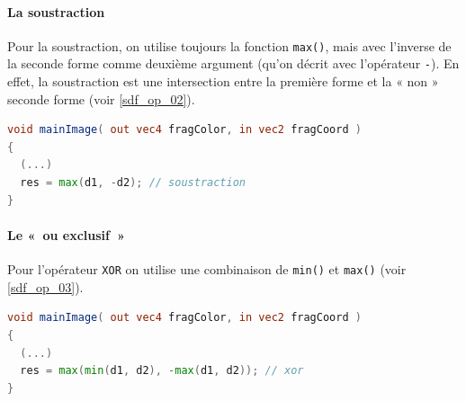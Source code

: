 \paragraph*{La soustraction}

Pour la soustraction, on utilise toujours la fonction \lstinline{max()}, mais avec l'inverse de la seconde forme comme deuxième argument (qu'on décrit avec l'opérateur \lstinline{-}). En effet, la soustraction est une intersection entre la première forme et la « non » seconde forme (voir \ref{sdf_op_02}).

\begin{minipage}{\linewidth}
\begin{lstlisting}[language=GLSL, caption=Soustraction,captionpos=b,frame=single]
void mainImage( out vec4 fragColor, in vec2 fragCoord )
{
  (...)
  res = max(d1, -d2); // soustraction
}
\end{lstlisting}
\end{minipage}

\paragraph*{Le «~ou exclusif~»}

Pour l'opérateur \lstinline{XOR} on utilise une combinaison de \lstinline{min()} et \lstinline{max()} (voir \ref{sdf_op_03}).

\begin{minipage}{\linewidth}
\begin{lstlisting}[language=GLSL, caption=XOR,captionpos=b,frame=single]
void mainImage( out vec4 fragColor, in vec2 fragCoord )
{
  (...)
  res = max(min(d1, d2), -max(d1, d2)); // xor
}
\end{lstlisting}
\end{minipage}



